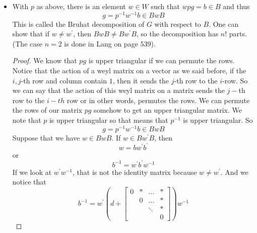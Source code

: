 \documentclass{article}
\begin{document}
\begin{itemize}
        \item With $p$ as above, there is an element $w \in W$ such that $wpg = b \in B$ and thus 
            \begin{equation*}
                g = p^{-1}w^{-1}b \in BwB
            \end{equation*}
        This is called the Bruhat decomposition of $G$ with respect to $B$. One can show that if $w \neq w^{\prime}$, then $BwB \neq Bw^{\prime}B$, so the decomposition has $n!$ parts. (The case $n = 2$ is done in Lang on page $539$).
            \begin{proof}
                We know that $pg$ is upper triangular if we can permute the rows. Notice that the action of a weyl matrix on a vector as we said before, if the $i, j$-th row and column contain $1$, then it sends the $j$-th row to the $i$-row. So we can say that the action of this weyl matrix on a matrix sends the $j-$th row to the $i-th$ row or in other words, permutes the rows. We can permute the rows of our matrix $pg$ somehow to get an upper triangular matrix. We note that $p$ is upper triangular so that means that $p^{-1}$ is upper triangular. So 
                    \begin{equation*}
                        g = p^{-1}w^{-1}b \in BwB
                    \end{equation*}
                Suppose that we have $w \in BwB$. If $w \in Bw^{\prime}B$, then 
                    \begin{equation*}
                        w = bw^{\prime}b^{\prime}
                    \end{equation*}
                or
                    \begin{equation*}
                        b^{-1} = w^{\prime}b^{\prime}w^{-1}
                    \end{equation*}
                If we look at $w^{\prime}w^{-1}$, that is not the identity matrix because $w \neq w^{\prime}$. And we notice that 
                    \begin{equation*}
                        b^{-1} = w^{\prime}\left(d + \begin{bmatrix}
                            0 & * & \ldots  & * \\
                              & 0 & \ldots  & * \\
                              &   & \ddots  & * \\
                              &   &         & 0   
                        \end{bmatrix}\right)w^{-1}

\end{equation*}
\end{proof}
\end{itemize}
\end{document}

